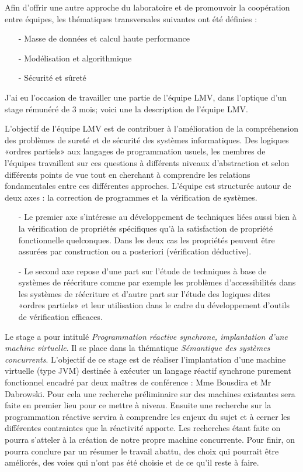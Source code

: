 \documentclass[10pt,a4paper]{article}
\begin{document}
		Afin d'offrir une autre approche du laboratoire et de promouvoir la coopération entre équipes, les thématiques transversales suivantes ont été définies :
		\begin{enumerate}
			\item[-] Masse de données et calcul haute performance
			\item[-] Modélisation et algorithmique
			\item[-] Sécurité et sûreté
		\end{enumerate}
		\medbreak
		
		J'ai eu l'occasion de travailler une partie de l'équipe LMV, dans l'optique d'un stage rémunéré de 3 mois; voici une la description de l'équipe LMV.
		\medbreak
		
		L'objectif de l'équipe LMV est de contribuer à l'amélioration de la compréhension des problèmes de sureté et de sécurité des systèmes  informatiques. Des logiques «ordres partiels» aux langages de programmation usuels, les membres de l'équipes travaillent sur ces questions à différents niveaux d'abstraction et selon différents points de vue tout en cherchant à comprendre les relations fondamentales entre ces différentes approches. L'équipe est structurée autour de deux axes : la correction de programmes et la vérification de systèmes.
		\begin{enumerate}
			\item[-] Le premier axe s'intéresse au développement de techniques liées aussi bien à la vérification de propriétés spécifiques qu'à la satisfaction de propriété fonctionnelle quelconques. Dans les deux cas les propriétés peuvent être assurées par construction ou a posteriori (vérification déductive).
			\item[-] Le second axe repose d'une part sur l'étude de techniques à base de systèmes de réécriture comme par exemple les problèmes d'accessibilités dans les systèmes de réécriture et d'autre part sur l'étude des logiques dites «ordres partiels» et leur utilisation dans le cadre du développement d'outils de vérification efficaces.
		\end{enumerate}
		\bigbreak
		
		Le stage a pour intitulé \textit{Programmation réactive synchrone, implantation d’une machine virtuelle}. Il se place dans la thématique \textit{Sémantique des systèmes concurrents}. L’objectif de ce stage est de réaliser l’implantation d’une machine virtuelle (type JVM) destinée à exécuter un langage réactif synchrone purement fonctionnel encadré par deux maîtres de conférence : Mme Bousdira et Mr Dabrowski.
		\smallbreak
		Pour cela une recherche préliminaire sur des machines existantes sera faite en premier lieu pour ce mettre à niveau. Ensuite une recherche sur la programmation réactive servira à comprendre les enjeux du sujet et à cerner les différentes contraintes que la réactivité apporte. Les recherches étant faite on pourra s'atteler à la création de notre propre machine concurrente. Pour finir, on pourra conclure par un résumer le travail abattu, des choix qui pourrait être améliorés, des voies qui n'ont pas été choisie et de ce qu'il reste à faire.
		\newpage
		
\end{document}
